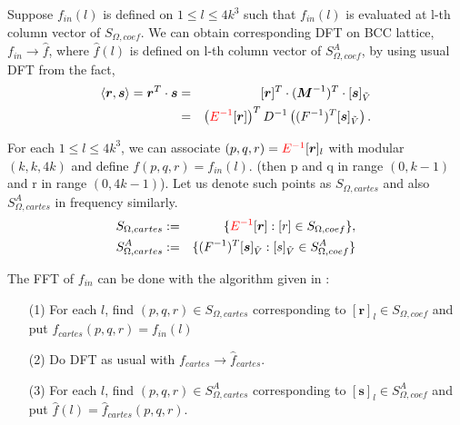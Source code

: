 \documentclass[10pt]{book}
\def\bm{\boldsymbol}
\newcommand{\bea}{\begin{eqnarray}}
\newcommand{\eea}{\end{eqnarray}}
\newcommand{\no}{\nonumber \\}
\def\la{\langle}
\def\ra{\rangle}
\begin{document}
Suppose $f_{in}(l)$ is defined on $1\leq l\leq 4k^3$
such that $f_{in}(l)$ is evaluated at l-th column vector of  $S_{\Omega,coef}$.
We can obtain corresponding DFT on BCC lattice, $f_{in}\to \hat{f}$, 
where $\hat{f}(l)$ is defined on l-th column vector of $S^A_{\Omega,coef}$,
by using usual DFT from the fact,  
\bea 
\la {\bm r},{\bm s}\ra ={\bm r}^T\cdot{\bm s}
&=&[{\bm r}]^T\cdot({\bm M}^{-1})^T\cdot[{\bm s}]_{\tilde V} \no 
&=& \left( {\color{red}E^{-1}}[{\bm r}]\right)^T  D^{-1} \left( (F^{-1})^T[{\bm s}]_{\tilde V} \right). 
\eea 

For each $1\leq l\leq 4k^3$, we can associate $(p,q,r)={\color{red}E^{-1}}[{\bm r}]_l$ with modular $(k,k,4k)$
and define $f(p,q,r)=f_{in}(l)$. 
(then p and q in range $(0,k-1)$ and r in range $(0,4k-1)$).
Let us denote such points as $S_{\Omega,cartes}$ and 
also $S^A_{\Omega,cartes}$ in frequency similarly.
\bea 
S_{\Omega,cartes}&:=&\{{\color{red}E^{-1}}[{\bm r}] : [r]\in S_{\Omega,coef}  \},\no 
S^A_{\Omega,cartes}&:=&\{(F^{-1})^T[{\bm s}]_{\tilde V} : [s]_{\tilde V}\in S^A_{\Omega,coef} \}
\eea 

The FFT of $f_{in}$ can be done with the algorithm given in \cite{Zheng}: 
\begin{itemize}
	\item[(1)] For each $l$, find $(p,q,r)\in S_{\Omega,cartes}$ corresponding to $[{\bm r}]_l\in S_{\Omega,coef}$ 
	and put $f_{cartes}(p,q,r)=f_{in}(l)$
	\item[(2)] Do DFT as usual with $f_{cartes}\to \hat{f}_{cartes}$.
	\item[(3)] For each $l$, find $(p,q,r)\in S^A_{\Omega,cartes}$ corresponding to $[{\bm s}]_l\in S^A_{\Omega,coef}$
	and put $\hat{f}(l)=\hat{f}_{cartes}(p,q,r)$.
\end{itemize}
\end{document}
